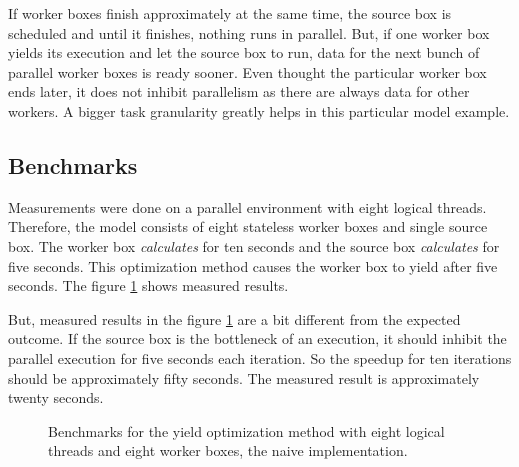 If worker boxes finish approximately at the same time, the source box is scheduled and until it finishes, nothing runs in parallel. But, if one worker box yields its execution and let the source box to run, data for the next bunch of parallel worker boxes is ready sooner. Even thought the particular worker box ends later, it does not inhibit parallelism as there are always data for other workers. A bigger task granularity greatly helps in this particular model example.

\subsection{Benchmarks}
Measurements were done on a parallel environment with eight logical threads. Therefore, the model consists of eight stateless worker boxes and single source box. The worker box \textit{calculates} for ten seconds and the source box \textit{calculates} for five seconds. This optimization method causes the worker box to yield after five seconds. The figure \ref{yield-bench} shows measured results.

But, measured results in the figure \ref{yield-bench} are a bit different from the expected outcome. If the source box is the bottleneck of an execution, it should inhibit the parallel execution for five seconds each iteration. So the speedup for ten iterations should be approximately fifty seconds. The measured result is approximately twenty seconds.

\begin{figure}[h!]
\vspace{.5cm}
\centering
{}
\caption{Benchmarks for the yield optimization method with eight logical threads and eight worker boxes, the naive implementation.}
\label{yield-bench}
\end{figure}


